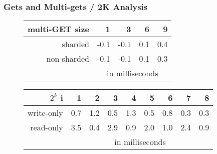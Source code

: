 \documentclass[report.tex]{subfiles}
\begin{document}
\subsubsection{Gets and Multi-gets / 2K Analysis}\label{exp5_ilaw}\label{exp6_ilaw}
\vspace{-5mm}
\begin{figure}[H]
	\centering
	\begin{minipage}[c]{0.4\linewidth}
		\centering
		\scriptsize{
		\setlength{\tabcolsep}{4.5pt}
		\begin{tabular}{|r|*{4}{r}|}
			\cline{2-5}
			\multicolumn{1}{c|}{multi-GET size} & 1 & 3 & 6 & 9 \Tstrut\\
			\hline
			sharded & -0.1 & -0.1 & 0.1 & 0.4\Tstrut\\
			non-sharded & -0.1 & -0.1 & 0.1 & 0.3 \\
			& \multicolumn{4}{c|}{in milliseconds} \\
			\hline 
		\end{tabular}}
	\end{minipage}
	\hspace{0.5cm}
	\begin{minipage}[c]{0.45\linewidth}
		\centering
		\scriptsize{
		\setlength{\tabcolsep}{4.5pt}
		\begin{tabular}{|r|*{8}{r}|}
			\cline{2-9}
			\multicolumn{1}{r|}{$2^k$ i} & 1 & 2 & 3 & 4 & 5 & 6 & 7 & 8 \Tstrut\\
			\hline
			write-only & 0.7 & 1.2 & 0.5 & 1.3 & 0.5 & 0.8 & 0.3 & 0.3\Tstrut\\
			read-only & 3.5 & 0.4 & 2.9 & 0.9 &	2.0 & 1.0 & 2.4 & 0.9\\
			& \multicolumn{8}{c|}{in milliseconds} \\
			\hline 
		\end{tabular}
	}
	\end{minipage}
\end{figure}
\end{document}
